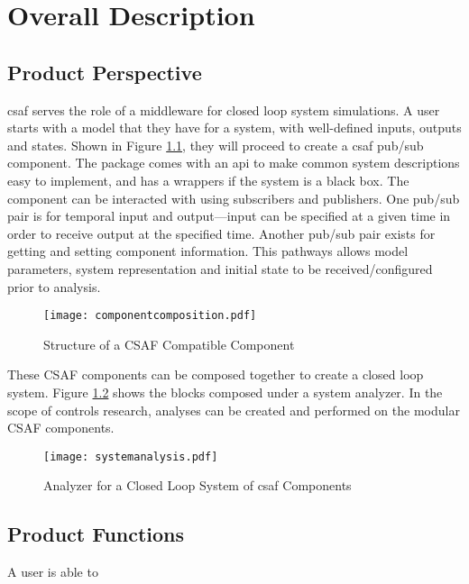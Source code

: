\chapter{Overall Description}

\section{Product Perspective}

\acrshort{csaf} serves the role of a middleware for closed loop system simulations. A user starts with a model that they have for a system, with well-defined inputs, outputs and states. Shown in Figure \ref{fig:ccomp}, they will proceed to create a \acrshort{csaf} pub/sub component. The package comes with an \acrshort{api} to make common system descriptions easy to implement, and has a wrappers if the system is a black box. The component can be interacted with using subscribers and publishers. One pub/sub pair is for temporal input and output---input can be specified at a given time in order to receive output at the specified time. Another pub/sub pair exists for getting and setting component information. This pathways allows model parameters, system representation and initial state to be received/configured prior to analysis.\\

\begin{figure}
\centering
\texttt{[image: componentcomposition.pdf]}
\caption{Structure of a CSAF Compatible Component}
\label{fig:ccomp}
\end{figure}

These CSAF components can be composed together to create a closed loop system. Figure \ref{fig:csys} shows the blocks composed under a system analyzer. In the scope of controls research, analyses can be created and performed on the modular CSAF components. \\

\begin{figure}
\centering
\texttt{[image: systemanalysis.pdf]}
\caption{Analyzer for a Closed Loop System of \acrshort{csaf} Components }
\label{fig:csys}
\end{figure}


\section{Product Functions}

A user is able to

